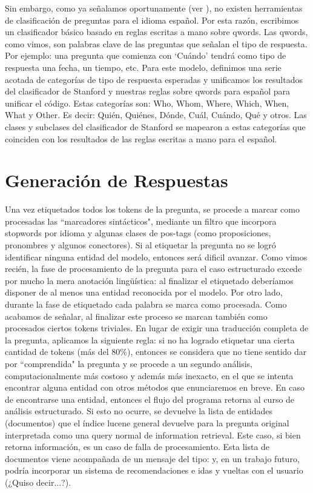 Sin embargo, como ya señalamos oportunamente (ver ), no existen herramientas de clasificación de preguntas para el idioma español. Por esta razón, escribimos un clasificador básico basado en reglas escritas a mano sobre qwords. Las qwords, como vimos, son palabras clave de las preguntas que señalan el tipo de respuesta. Por ejemplo: una pregunta que comienza con `Cuándo' tendrá como tipo de respuesta una fecha, un tiempo, etc. Para este modelo, definimos una serie acotada de categorías de tipo de respuesta esperadas y unificamos los resultados del clasificador de Stanford y nuestras reglas sobre qwords para español para unificar el código. Estas categorías son:  Who, Whom, Where, Which,  When,  What y Other. Es decir: Quién, Quiénes, Dónde, Cuál, Cuándo, Qué y otros. Las clases y subclases del clasificador de Stanford se mapearon a estas categorías que coinciden con los resultados de las reglas escritas a mano para el español. 


\section{Generación de Respuestas}
\label{sec:ar-mitic}

Una vez etiquetados todos los tokens de la pregunta, se procede a marcar como procesadas las ``marcadores sintácticos", mediante un filtro que incorpora stopwords por idioma y algunas clases de pos-tags (como proposiciones, pronombres y algunos conectores). Si al etiquetar la pregunta no se logró identificar ninguna entidad del modelo, entonces será dificil avanzar. Como vimos recién, la fase de procesamiento de la pregunta para el caso estructurado excede por mucho la mera anotación lingüística: al finalizar el etiquetado deberíamos disponer de al menos una entidad reconocida por el modelo. Por otro lado, durante la fase de etiquetado cada palabra se marca como procesada. Como acabamos de señalar, al finalizar este proceso se marcan también como procesados ciertos tokens triviales. En lugar de exigir una traducción completa de la pregunta, aplicamos la siguiente regla: si no ha logrado etiquetar una cierta cantidad de tokens (más del 80\%), entonces se considera que no tiene sentido dar por ``comprendida" la pregunta y se procede a un segundo análisis, computacionalmente más costoso y además más inexacto, en el que se intenta encontrar alguna entidad con otros métodos que enunciaremos en breve. En caso de encontrarse una entidad, entonces el flujo del programa retorna al curso de análisis estructurado. Si esto no ocurre, se devuelve la lista de entidades (documentos) que el índice lucene general devuelve para la pregunta original interpretada como una query normal de information retrieval. Este caso, si bien retorna información, es un caso de falla de procesamiento. Esta lista de documentos viene acompañada de un mensaje del tipo:  y, en un trabajo futuro, podría incorporar un sistema de recomendaciones e idas y vueltas con el usuario (¿Quiso decir...?).

